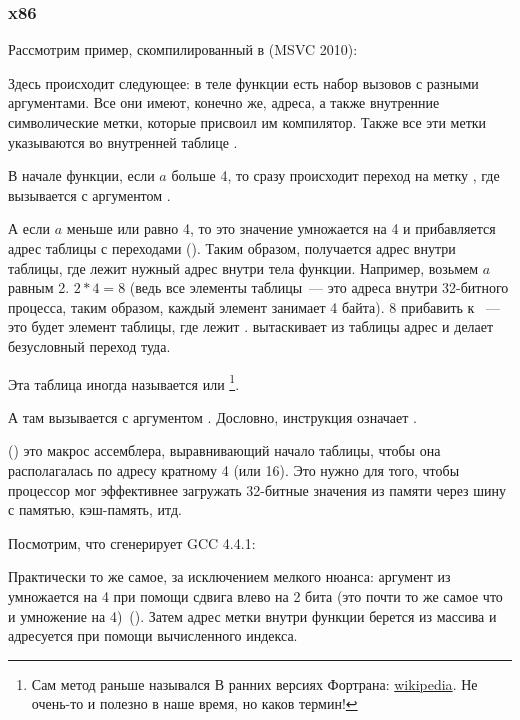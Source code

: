 \subsubsection{x86}


Рассмотрим пример, скомпилированный в (MSVC 2010):



Здесь происходит следующее: в теле функции есть набор вызовов \printf с разными аргументами. 
Все они имеют, конечно же, адреса, а также внутренние символические метки, которые присвоил им компилятор.
Также все эти метки указываются во внутренней таблице .

В начале функции, если $a$ больше 4, то сразу происходит переход на метку , 
где вызывается \printf с аргументом .

А если $a$ меньше или равно 4, то это значение умножается на 4 и прибавляется адрес таблицы 
с переходами (). 
Таким образом, получается адрес внутри таблицы, где лежит нужный адрес внутри тела функции. 
Например, возьмем $a$ равным 2. $2*4 = 8$ (ведь все элементы таблицы~--- это адреса внутри 32-битного процесса, 
таким образом, каждый элемент занимает 4 байта). 8 прибавить к ~--- это будет элемент таблицы,
где лежит . \JMP вытаскивает из таблицы адрес  и делает безусловный переход туда.

Эта таблица иногда называется  или
\footnote{Сам метод раньше назывался 
 В ранних версиях Фортрана:
\href{http://go.yurichev.com/17122}{wikipedia}.
Не очень-то и полезно в наше время, но каков термин!}.

А там вызывается \printf с аргументом . 
Дословно, инструкция  
означает  .

 () это макрос ассемблера, выравнивающий начало таблицы, 
чтобы она располагалась по адресу кратному 4 (или 16).
Это нужно для того, чтобы процессор мог эффективнее загружать 32-битные 
значения из памяти через шину с памятью, кэш-память, итд.



\label{switch_lot_GCC}

Посмотрим, что сгенерирует GCC 4.4.1:



Практически то же самое, за исключением мелкого нюанса: аргумент из  умножается на 4 
при помощи сдвига влево на 2 бита (это почти то же самое что и умножение на 4)~().
Затем адрес метки внутри функции берется из массива  и адресуется при помощи 
вычисленного индекса.

